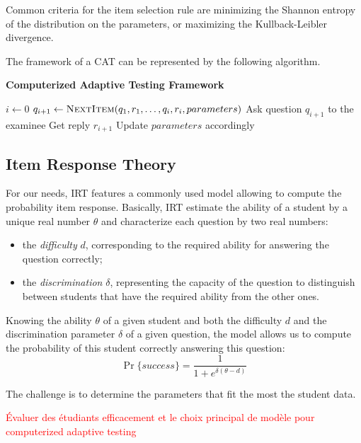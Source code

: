 \documentclass{sig-alternate}
\newcommand\alert[1]{\textcolor{red}{#1}}
\begin{document}
Common criteria for the item selection rule are minimizing the Shannon entropy of the distribution on the parameters, or maximizing the Kullback-Leibler divergence. %

The framework of a CAT can be represented by the following algorithm.

\begin{algorithm}
\caption*{\textbf{Computerized Adaptive Testing Framework}}
\begin{algorithmic}
\State $i \gets 0$
	\State $q_{i + 1} \gets \Call{NextItem}{q_1, r_1, \ldots, q_i, r_i, parameters}$
	\State Ask question $q_{i + 1}$ to the examinee
	\State Get reply $r_{i + 1}$
	\State Update $parameters$ accordingly
\EndWhile
\EndProcedure
\end{algorithmic}
\end{algorithm}

\subsection{Item Response Theory}

For our needs, IRT features a commonly used model allowing to compute the probability item response. Basically, IRT estimate the ability of a student by a unique real number $\theta$ and characterize each question by two real numbers:

\begin{itemize}
\item the \emph{difficulty} $d$, corresponding to the required ability for answering the question correctly; %
\item the \emph{discrimination} $\delta$, representing the capacity of the question to distinguish between students that have the required ability from the other ones.
\end{itemize}

Knowing the ability $\theta$ of a given student and both the difficulty $d$ and the discrimination parameter $\delta$ of a given question, the model allows us to compute the probability of this student correctly answering this question:
\[ \Pr\{success\} = \frac1{1+e^{\delta(\theta - d)}} \]

The challenge is to determine the parameters that fit the most the student data.

\alert{Évaluer des étudiants efficacement et le choix principal de modèle pour computerized adaptive testing}
\end{document}
